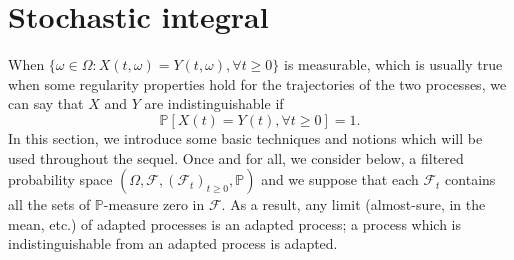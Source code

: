 \section{Stochastic integral}
When $\{\omega \in \Omega: X(t, \omega)=Y(t, \omega), \forall t \geq 0\}$ is measurable, which is usually true when some regularity properties hold for the trajectories of the two processes, we can say that $X$ and $Y$ are indistinguishable if \[ \mathbb{P}[X(t)=Y(t), \forall t \geq 0]=1. \]
In this section, we introduce some basic techniques and notions which will be used throughout the sequel. Once and for all, we consider below, a filtered probability space $\left(\Omega, \mathcal{F}, (\mathcal{F}_{t})_{t \geq 0}, \mathbb{P}\right)$ and we suppose that each $\mathcal{F}_{t}$ contains all the sets of $\mathbb{P}$-measure zero in $\mathcal{F}$. As a result, any limit (almost-sure, in the mean, etc.) of adapted processes is an adapted process; a process which is indistinguishable from an adapted process is adapted.

